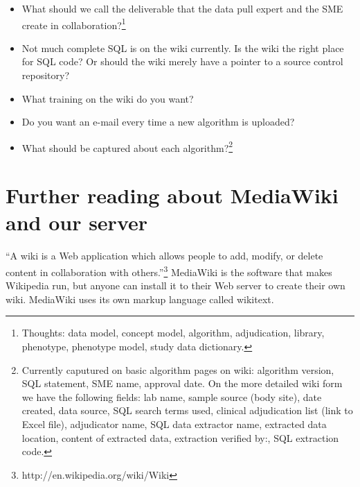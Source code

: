 \documentclass{tufte-handout}
\begin{document}
\begin{itemize}

\item What should we call the deliverable that the data pull expert
  and the SME create in collaboration?\footnote{Thoughts: data
    model, concept model, algorithm, adjudication, library, phenotype,
    phenotype model, study data dictionary.}

\item Not much complete SQL is on the wiki currently. Is the wiki the
  right place for SQL code? Or should the wiki merely have a pointer
  to a source control repository?

\item What training on the wiki do you want?

\item Do you want an e-mail every time a new algorithm is uploaded?

\item What should be captured about each algorithm?\footnote{Currently
  caputured on basic algorithm pages on wiki: algorithm version, SQL
  statement, SME name, approval date. On the more detailed wiki form
  we have the following fields: lab name, sample source (body site),
  date created, data source, SQL search terms used, clinical
  adjudication list (link to Excel file), adjudicator name, SQL data
  extractor name, extracted data location, content of extracted data,
  extraction verified by:, SQL extraction code.}

\end{itemize}

\section{Further reading about MediaWiki and our server}

``A wiki is a Web application which allows people to add, modify, or
delete content in collaboration with
others.''\footnote{http://en.wikipedia.org/wiki/Wiki} MediaWiki is the
software that makes Wikipedia run, but anyone can install it to their
Web server to create their own wiki. MediaWiki uses its own markup
language called wikitext.
\end{document}
